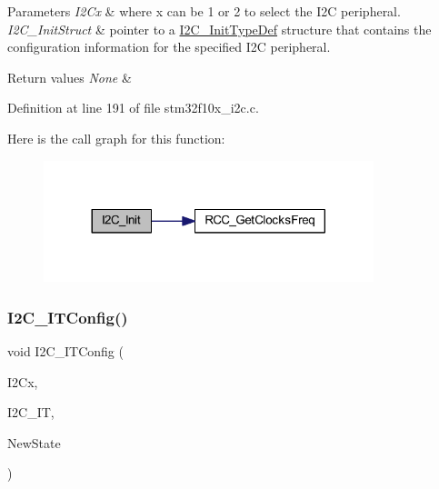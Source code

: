 \begin{DoxyParams}{Parameters}
{\em I2\+Cx} & where x can be 1 or 2 to select the I2C peripheral. \\
\hline
{\em I2\+C\+\_\+\+Init\+Struct} & pointer to a \hyperlink{struct_i2_c___init_type_def}{I2\+C\+\_\+\+Init\+Type\+Def} structure that contains the configuration information for the specified I2C peripheral. \\
\hline
\end{DoxyParams}

\begin{DoxyRetVals}{Return values}
{\em None} & \\
\hline
\end{DoxyRetVals}


Definition at line 191 of file stm32f10x\+\_\+i2c.\+c.

Here is the call graph for this function\+:
\nopagebreak
\begin{figure}[H]
\begin{center}
\leavevmode
\includegraphics[width=272pt]{group___i2_c___exported___functions_gaac29465bca70fbc91c2f922ab67bb88e_cgraph}
\end{center}
\end{figure}
\mbox{\label{group___i2_c___exported___functions_ga58fed146a06cb81d2940604e460de047}} 
\subsubsection{\texorpdfstring{I2\+C\+\_\+\+I\+T\+Config()}{I2C\_ITConfig()}}
{\footnotesize\ttfamily void I2\+C\+\_\+\+I\+T\+Config (\begin{DoxyParamCaption}\item[{\hyperlink{struct_i2_c___type_def}{I2\+C\+\_\+\+Type\+Def} $\ast$}]{I2\+Cx,  }\item[{uint16\+\_\+t}]{I2\+C\+\_\+\+IT,  }\item[{\hyperlink{group___exported__types_gac9a7e9a35d2513ec15c3b537aaa4fba1}{Functional\+State}}]{New\+State }\end{DoxyParamCaption})}



